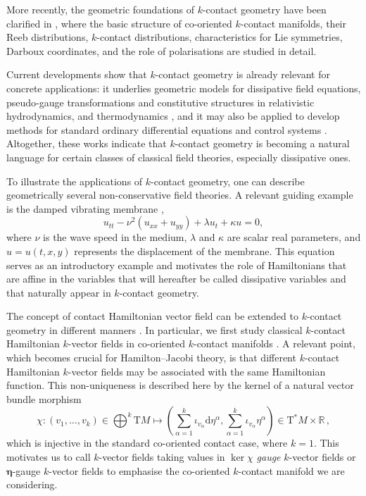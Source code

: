 \documentclass[11pt,twoside]{article}
\theoremstyle{plain}
\theoremstyle{definition}
\theoremstyle{remark}
\renewcommand{\d}{\mathrm{d}}
\newcommand{\T}{\mathrm{T}}
\begin{document}
More recently, the geometric foundations of $k$-contact geometry have been clarified in \cite{LRS_25}, where the basic structure of co-oriented $k$-contact manifolds, their Reeb distributions, $k$-contact distributions, characteristics for Lie symmetries, Darboux coordinates, and the role of polarisations are studied in detail. 

Current developments show that $k$-contact geometry is already relevant for concrete applications: it underlies geometric models for dissipative field equations, pseudo-gauge transformations and constitutive structures in relativistic hydrodynamics, and thermodynamics \cite{GGMRR_20,GGMRR_21,HLM_26}, and it may also be applied to develop methods for standard ordinary differential equations and control systems \cite{CAR_25, deLucasRivasSobczak2026,LRS_25,SF_25}. Altogether, these works indicate that $k$-contact geometry is becoming a natural language for certain classes of classical field theories, especially dissipative ones.

To illustrate the applications of $k$-contact geometry, one can describe geometrically several non-conservative field theories. A relevant guiding example is the damped vibrating membrane \cite{Rao2007,Graff1975,MorseIngard1968},
\begin{equation*} 
u_{tt}-\nu^2(u_{xx}+u_{yy})+\lambda u_t+\kappa u=0,
\end{equation*}
where $\nu$ is the wave speed in the medium, $\lambda$ and $\kappa$ are scalar real parameters, and $u=u(t,x,y)$ represents the displacement of the membrane. This equation serves as an introductory example and motivates the role of Hamiltonians that are affine in the variables that will hereafter be called dissipative variables and that naturally appear in $k$-contact geometry.


The concept of contact Hamiltonian vector field can be extended to $k$-contact geometry in different manners \cite{LRS_25,Riv_22}. In particular, we first study classical $k$-contact Hamiltonian $k$-vector fields in co-oriented $k$-contact manifolds \cite{Riv_22}. 
A relevant point, which becomes crucial for Hamilton--Jacobi theory, is that different $k$-contact Hamiltonian $k$-vector fields may be associated with the same Hamiltonian function. This non-uniqueness \cite{HLM_26} is described here by the kernel of a natural vector bundle morphism
\[
\textstyle\chi\colon (v_1,\dotsc,v_k)\in 
\bigoplus^k \T M\longmapsto \left(\sum_{\alpha=1}^k\iota_{v_\alpha}\d\eta^\alpha,\sum_{\alpha=1}^k\iota_{v_\alpha}\eta^\alpha\right)\in \T^*M\times\mathbb R\,,
\]
which is injective in the standard co-oriented contact case, where $k=1$. This motivates us to call $k$-vector fields taking values in $\ker\chi$ {\it gauge} $k$-vector fields or ${\bm\eta}$-gauge $k$-vector fields to emphasise the co-oriented $k$-contact manifold we are considering. 
\end{document}
